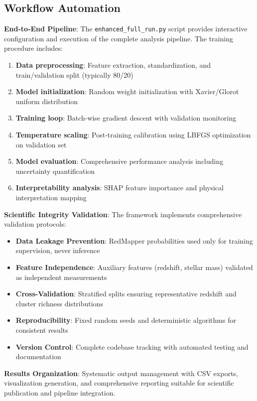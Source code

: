 \documentclass[twocolumn,10pt]{aastex631}
\begin{document}
\subsection{Workflow Automation}

\textbf{End-to-End Pipeline}: The \texttt{enhanced\_full\_run.py} script provides interactive configuration and execution of the complete analysis pipeline. The training procedure includes:
\begin{enumerate}
\item \textbf{Data preprocessing}: Feature extraction, standardization, and train/validation split (typically 80/20)
\item \textbf{Model initialization}: Random weight initialization with Xavier/Glorot uniform distribution
\item \textbf{Training loop}: Batch-wise gradient descent with validation monitoring
\item \textbf{Temperature scaling}: Post-training calibration using LBFGS optimization on validation set
\item \textbf{Model evaluation}: Comprehensive performance analysis including uncertainty quantification
\item \textbf{Interpretability analysis}: SHAP feature importance and physical interpretation mapping
\end{enumerate}

\textbf{Scientific Integrity Validation}: The framework implements comprehensive validation protocols:
\begin{itemize}
\item \textbf{Data Leakage Prevention}: RedMapper probabilities used only for training supervision, never inference
\item \textbf{Feature Independence}: Auxiliary features (redshift, stellar mass) validated as independent measurements
\item \textbf{Cross-Validation}: Stratified splits ensuring representative redshift and cluster richness distributions
\item \textbf{Reproducibility}: Fixed random seeds and deterministic algorithms for consistent results
\item \textbf{Version Control}: Complete codebase tracking with automated testing and documentation
\end{itemize}

\textbf{Results Organization}: Systematic output management with CSV exports, visualization generation, and comprehensive reporting suitable for scientific publication and pipeline integration.
\end{document}
